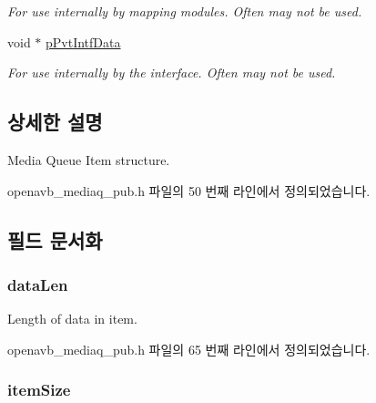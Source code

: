\begin{DoxyCompactItemize}
\begin{DoxyCompactList}\small\item\em For use internally by mapping modules. Often may not be used. \end{DoxyCompactList}\item 
void $\ast$ \hyperlink{structmedia__q__item__t_a44191a670acf801794664815b343674d}{p\+Pvt\+Intf\+Data}
\begin{DoxyCompactList}\small\item\em For use internally by the interface. Often may not be used. \end{DoxyCompactList}\end{DoxyCompactItemize}


\subsection{상세한 설명}
Media Queue Item structure. 

openavb\+\_\+mediaq\+\_\+pub.\+h 파일의 50 번째 라인에서 정의되었습니다.



\subsection{필드 문서화}
\subsubsection[{\texorpdfstring{data\+Len}{dataLen}}]{ data\+Len}\hypertarget{structmedia__q__item__t_a1dfc68b1003d0c64f82d4c19649c2c52}{}\label{structmedia__q__item__t_a1dfc68b1003d0c64f82d4c19649c2c52}


Length of data in item. 



openavb\+\_\+mediaq\+\_\+pub.\+h 파일의 65 번째 라인에서 정의되었습니다.

\subsubsection[{\texorpdfstring{item\+Size}{itemSize}}]{ item\+Size}\hypertarget{structmedia__q__item__t_a91e248b2730fbe7951ac5d9d3aae1752}{}\label{structmedia__q__item__t_a91e248b2730fbe7951ac5d9d3aae1752}



